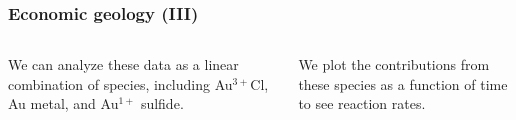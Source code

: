 \documentclass[10pt, xcolor=x11names, compress]{beamer}
\begin{document}
\begin{frame}
  \frametitle{Economic geology (III)}

  \begin{columns}[T]
    \begin{column}{0.5\linewidth}
      We can analyze these data as a linear combination of species,
      including {\color{Green4}Au$^{3+}$Cl}, {\color{Purple4}Au
        metal}, and {\color{Orange2}Au$^{1+}$ sulfide}.
    \end{column}
    \begin{column}{0.5\linewidth}
      We plot the contributions from these species as a function of
      time to see reaction rates.
    \end{column}
  \end{columns}

  \bigskip


\end{frame}
\end{document}
